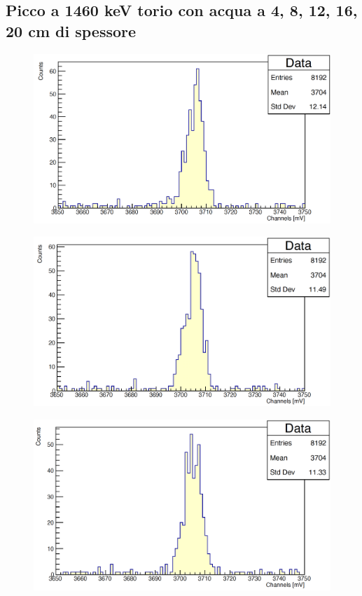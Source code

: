 \documentclass[a4paper,10pt]{article}
\begin{document}
\subsection{Picco a 1460 keV torio con acqua a 4, 8, 12, 16, 20 cm di spessore}
\begin{figure}[H]
    \centering
    \includegraphics[scale=0.45]{appendice/spettri/ThA_1460_4}
\end{figure}
\begin{figure}[H]
    \centering
    \includegraphics[scale=0.45]{appendice/spettri/ThA_1460_8}
\end{figure}
\begin{figure}[H]
    \centering
    \includegraphics[scale=0.45]{appendice/spettri/ThA_1460_12}
\end{figure}
\end{document}
